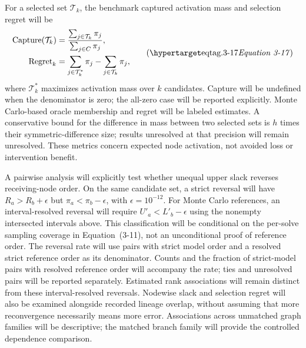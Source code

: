 For a selected set $\mathcal{T}_k$, the benchmark captured activation mass and
selection regret will be
\[
\begin{aligned}
\operatorname{Capture}(\mathcal{T}_k)&=
\frac{\sum_{j\in \mathcal{T}_k}\pi_j}{\sum_{j\in C}\pi_j},\\
\operatorname{Regret}_k&=
\sum_{j\in \mathcal{T}_k^*}\pi_j-\sum_{j\in \mathcal{T}_k}\pi_j,
\end{aligned}
\eqtag{3-17}
\]
where $\mathcal{T}_k^*$ maximizes activation mass over $k$ candidates. Capture will
be undefined when the denominator is zero; the all-zero case will be
reported explicitly. Monte Carlo-based oracle membership and regret will
be labeled estimates. A conservative bound for the difference in mass
between two selected sets is $h$ times their symmetric-difference size;
results unresolved at that precision will remain unresolved. These metrics
concern expected node activation, not avoided loss or intervention benefit.

A pairwise analysis will explicitly test whether unequal upper slack
reverses receiving-node order. On the same candidate set, a strict reversal
will have $R_a>R_b+\epsilon$ but $\pi_a<\pi_b-\epsilon$, with
$\epsilon=10^{-12}$. For Monte Carlo references, an interval-resolved reversal will
require $U'_a<L'_b-\epsilon$ using the nonempty intersected intervals above.
This classification will be conditional on the per-solve sampling coverage
in Equation~(3-11), not an unconditional proof of reference order.
The reversal rate will use pairs with strict model order and a resolved strict
reference order as its denominator. Counts and the fraction of strict-model
pairs with resolved reference order will accompany the rate; ties and
unresolved pairs will be reported separately. Estimated rank associations
will remain distinct from these interval-resolved reversals. Nodewise slack and
selection regret will also be examined alongside recorded lineage overlap,
without assuming that more reconvergence necessarily means more error.
Associations across unmatched graph families will be descriptive; the matched
branch family will provide the controlled dependence comparison.


